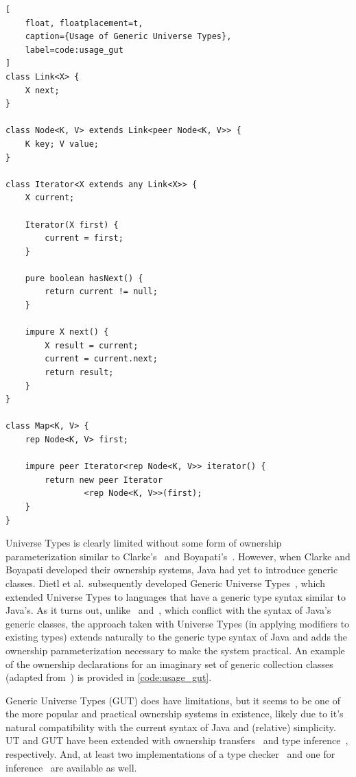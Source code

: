 \documentclass{acm_proc_article-sp}
\begin{document}
\begin{lstlisting}[
	float, floatplacement=t,
	caption={Usage of Generic Universe Types},
	label=code:usage_gut
]
class Link<X> {
	X next;
}

class Node<K, V> extends Link<peer Node<K, V>> {
	K key; V value;
}

class Iterator<X extends any Link<X>> {
	X current;
	
	Iterator(X first) {
		current = first;
	}
	
	pure boolean hasNext() {
		return current != null;
	}
	
	impure X next() {
		X result = current;
		current = current.next;
		return result;
	}
}

class Map<K, V> {
	rep Node<K, V> first;

	impure peer Iterator<rep Node<K, V>> iterator() {
		return new peer Iterator
				<rep Node<K, V>>(first);
	}
}
\end{lstlisting}

Universe Types is clearly limited without some form of ownership
parameterization similar to Clarke's~\cite{clarke03ownership} and
Boyapati's~\cite{boyapati04safejava}. However, when Clarke and Boyapati
developed their ownership systems, Java had yet to introduce generic classes.
Dietl et al.\ subsequently developed Generic Universe
Types~\cite{dietl07gut,dietl09gut,dietl11gut}, which extended Universe Types to
languages that have a generic type syntax similar to Java's. As it turns out,
unlike~\cite{clarke03ownership} and~\cite{boyapati04safejava}, which conflict
with the syntax of Java's generic classes, the approach taken with Universe
Types (in applying modifiers to existing types) extends naturally to the
generic type syntax of Java and adds the ownership parameterization necessary
to make the system practical. An example of the ownership declarations for an
imaginary set of generic collection classes (adapted from~\cite{dietl07gut}) is
provided in \cref{code:usage_gut}.

Generic Universe Types (GUT) does have limitations, but it seems to be one of
the more popular and practical ownership systems in existence, likely due to
it's natural compatibility with the current syntax of Java and (relative)
simplicity. UT and GUT have been extended with ownership
transfers~\cite{muller07transfer} and type inference~\cite{dietl11inference},
respectively. And, at least two implementations of a type
checker~\cite{cameron10gut,dietl14checker} and one for
inference~\cite{dietl14checker} are available as well.
\end{document}
